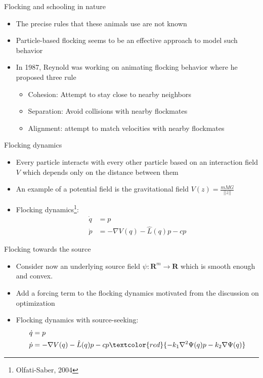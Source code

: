 \begin{frame}{Flocking and schooling in nature}
\begin{minipage}{0.45\textwidth}
\begin{figure}
	\end{figure}
\end{minipage}
\begin{itemize}	
	\item The precise rules that these animals use are not known
	\item Particle-based flocking seems to be an effective approach to model such behavior
	\item In 1987, Reynold was working on animating flocking behavior where he proposed three rule
	\begin{itemize}
		\item Cohesion: Attempt to stay close to nearby neighbors
		\item Separation: Avoid collisions with nearby flockmates
		\item Alignment: attempt to match velocities with nearby flockmates
	\end{itemize}
\end{itemize}
\end{frame}
\begin{frame}{Flocking dynamics}
\begin{itemize}
	\item Every particle interacts with every other particle based on an interaction field $V$ which depends only on the distance between them
	\item An example of a potential field is the gravitational field $V(z)=\frac{mMG}{||z||}$
	\item Flocking dynamics\footnote{Olfati-Saber, 2004}:
	\begin{equation*}
	\begin{split}
	\Dot{q}&=p\\
	\Dot{p}&=-\nabla V(q)-\hat{L}(q)p -cp 
	\end{split}
	\end{equation*}
\end{itemize}
\end{frame}
\begin{frame}{Flocking towards the source}
\begin{itemize}
\item Consider now an underlying source field $\psi:\mathbf{R}^m \xrightarrow{} \mathbf{R}$ which is smooth enough and convex.
\item Add a forcing term to the flocking dynamics motivated from the discussion on optimization
\item Flocking dynamics with source-seeking:
\begin{equation*}
\begin{split}
\Dot{q}&=p\\
\Dot{p}&=-\nabla V(q)-\hat{L}(q)p -cp\textcolor{red}{-k_1\nabla^2 \Psi(q) p -k_2 \nabla \Psi(q)}
\end{split}
\end{equation*}
\end{itemize}
\end{frame}
